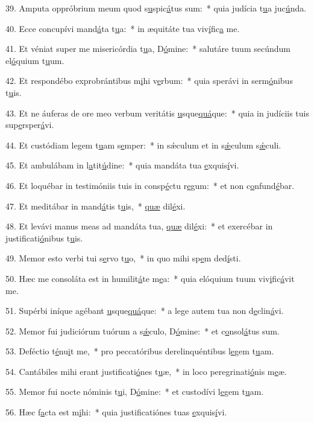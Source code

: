 39. Amputa oppróbrium meum quod s\uline{u}spic\uline{á}tus sum:~* quia judícia t\uline{u}a juc\uline{ú}nda.\par 
40. Ecce concupívi mand\uline{á}ta t\uline{u}a:~* in æquitáte tua viv\uline{í}fic\uline{a} me.\par 
41. Et véniat super me misericórdia t\uline{u}a, D\uline{ó}mine:~* salutáre tuum secúndum el\uline{ó}quium t\uline{u}um.\par 
42. Et respondébo exprobrántibus m\uline{i}hi v\uline{e}rbum:~* quia sperávi in serm\uline{ó}nibus t\uline{u}is.\par 
43. Et ne áuferas de ore meo verbum veritátis \uline{u}sque\uline{quá}que:~* quia in judíciis tuis sup\uline{e}rsper\uline{á}vi.\par 
44. Et custódiam legem t\uline{u}am s\uline{e}mper:~* in sǽculum et in s\uline{ǽ}culum s\uline{ǽ}culi.\par 
45. Et ambulábam in l\uline{a}tit\uline{ú}dine:~* quia mandáta tua \uline{e}xquis\uline{í}vi.\par 
46. Et loquébar in testimóniis tuis in consp\uline{é}ctu r\uline{e}gum:~* et non c\uline{o}nfund\uline{é}bar.\par 
47. Et meditábar in mand\uline{á}tis t\uline{u}is,~* \uline{quæ} dil\uline{é}xi.\par 
48. Et levávi manus meas ad mandáta tua, \uline{quæ} dil\uline{é}xi:~* et exercébar in justificati\uline{ó}nibus t\uline{u}is.\par 
49. Memor esto verbi tui s\uline{e}rvo t\uline{u}o,~* in quo mihi sp\uline{e}m ded\uline{í}sti.\par 
50. Hæc me consoláta est in humilit\uline{á}te m\uline{e}a:~* quia elóquium tuum viv\uline{i}fic\uline{á}vit me.\par 
51. Supérbi iníque agébant \uline{u}sque\uline{quá}que:~* a lege autem tua non d\uline{e}clin\uline{á}vi.\par 
52. Memor fui judiciórum tuórum a s\uline{ǽ}culo, D\uline{ó}mine:~* et c\uline{o}nsol\uline{á}tus sum.\par 
53. Deféctio t\uline{é}nu\uline{i}t me,~* pro peccatóribus derelinquéntibus l\uline{e}gem t\uline{u}am.\par 
54. Cantábiles mihi erant justificati\uline{ó}nes t\uline{u}æ,~* in loco peregrinati\uline{ó}nis m\uline{e}æ.\par 
55. Memor fui nocte nóminis t\uline{u}i, D\uline{ó}mine:~* et custodívi l\uline{e}gem t\uline{u}am.\par 
56. Hæc f\uline{a}cta est m\uline{i}hi:~* quia justificatiónes tuas \uline{e}xquis\uline{í}vi.\par 
